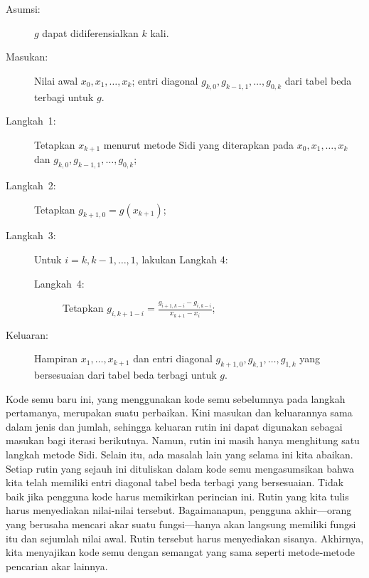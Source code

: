 \noindent\begin{pseudocode} 
\begin{description}
\item [{Asumsi:}] $g$ dapat didiferensialkan $k$ kali.
\item [{Masukan:}] Nilai awal $x_{0},x_{1},\ldots,x_{k}$; entri diagonal
$g_{k,0},g_{k-1,1},\ldots,g_{0,k}$ dari tabel beda terbagi untuk
$g$.
\item [{Langkah~1:}] Tetapkan $x_{k+1}$ menurut metode Sidi yang diterapkan
pada $x_{0},x_{1},\ldots,x_{k}$ dan $g_{k,0},g_{k-1,1},\ldots,g_{0,k}$;
\item [{Langkah~2:}] Tetapkan $g_{k+1,0}=g(x_{k+1})$;
\item [{Langkah~3:}] Untuk $i=k,k-1,\ldots,1$, lakukan Langkah 4:

\begin{description}
\item [{Langkah~4:}] Tetapkan ${\displaystyle g_{i,k+1-i}=\frac{g_{i+1,k-i}-g_{i,k-i}}{x_{k+1}-x_{i}}}$;
\end{description}
\item [{Keluaran:}] Hampiran $x_{1},\ldots,x_{k+1}$ dan entri diagonal
$g_{k+1,0},g_{k,1},\ldots,g_{1,k}$ yang bersesuaian dari tabel beda
terbagi untuk $g$.
\end{description}
\end{pseudocode} 

\noindent Kode semu baru ini, yang menggunakan kode semu sebelumnya
pada langkah pertamanya, merupakan suatu perbaikan. Kini masukan dan
keluarannya sama dalam jenis dan jumlah, sehingga keluaran rutin ini
dapat digunakan sebagai masukan bagi iterasi berikutnya. Namun, rutin
ini masih hanya menghitung satu langkah metode Sidi. Selain itu, ada
masalah lain yang selama ini kita abaikan. Setiap rutin yang sejauh
ini dituliskan dalam kode semu mengasumsikan bahwa kita telah memiliki
entri diagonal tabel beda terbagi yang bersesuaian. Tidak baik jika
pengguna kode harus memikirkan perincian ini. Rutin yang kita tulis
harus menyediakan nilai-nilai tersebut. Bagaimanapun, pengguna akhir---orang
yang berusaha mencari akar suatu fungsi---hanya akan langsung memiliki
fungsi itu dan sejumlah nilai awal. Rutin tersebut harus menyediakan
sisanya. Akhirnya, kita menyajikan kode semu dengan semangat yang
sama seperti metode-metode pencarian akar lainnya.

